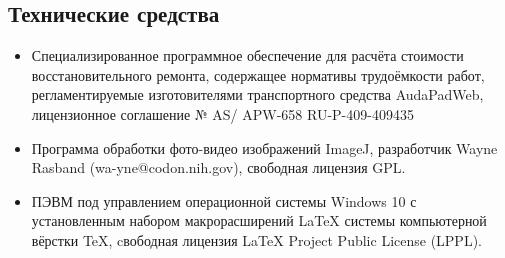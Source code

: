 \subsection{Технические средства}  %
\begin{itemize}
%
\item  Специализированное программное обеспечение для расчёта стоимости  восстановительного ремонта, содержащее нормативы трудоёмкости работ, регламентируемые изготовителями транспортного средства     AudaPadWeb, лицензионное соглашение № AS/\- APW-658  RU-P-409-409435
\item  Программа обработки фото-видео изображений ImageJ, разработчик  Wayne Rasband (wa-yne@codon.nih.gov),
свободная лицензия GPL.
\item  ПЭВМ под управлением операционной системы Windows 10 с установленным набором макрорасширений LaTeX системы компьютерной вёрстки TeX, cвободная лицензия LaTeX Project Public License (LPPL). 
%	
	\end{itemize}
